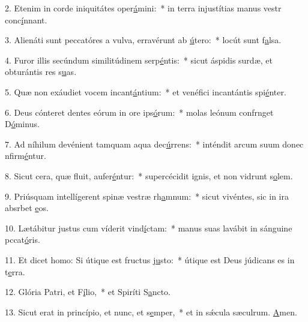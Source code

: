 2. Etenim in corde iniquitátes oper\uline{á}mini:~* in terra injustítias manus vestr conc\uline{í}nnant.\par 
3. Alienáti sunt peccatóres a vulva, erravérunt ab \uline{ú}tero:~* locút sunt f\uline{a}lsa.\par 
4. Furor illis secúndum similitúdinem serp\uline{é}ntis:~* sicut áspidis surdæ, et obturántis res s\uline{u}as.\par 
5. Quæ non exáudiet vocem incant\uline{á}ntium:~* et venéfici incantántis spi\uline{é}nter.\par 
6. Deus cónteret dentes eórum in ore ips\uline{ó}rum:~* molas leónum confrnget D\uline{ó}minus.\par 
7. Ad níhilum devénient tamquam aqua dec\uline{ú}rrens:~* inténdit arcum suum donec nfirm\uline{é}ntur.\par 
8. Sicut cera, quæ fluit, aufer\uline{é}ntur:~* supercécidit ignis, et non vidrunt s\uline{o}lem.\par 
9. Priúsquam intellígerent spinæ vestræ rh\uline{a}mnum:~* sicut vivéntes, sic in ira absrbet \uline{e}os.\par 
10. Lætábitur justus cum víderit vind\uline{í}ctam:~* manus suas lavábit in sánguine pccat\uline{ó}ris.\par 
11. Et dicet homo: Si útique est fructus j\uline{u}sto:~* útique est Deus júdicans es in t\uline{e}rra.\par 
12. Glória Patri, et F\uline{í}lio,~* et Spiríti S\uline{a}ncto.\par 
13. Sicut erat in princípio, et nunc, et s\uline{e}mper,~* et in sǽcula sæculrum. \uline{A}men.\par 
